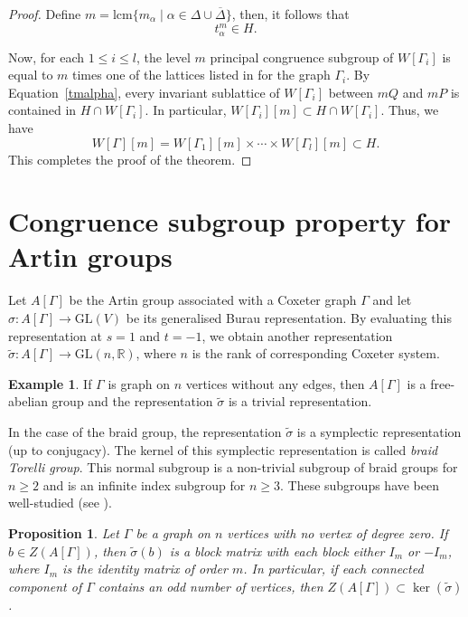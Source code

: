 \documentclass[12pt]{amsart}
\newtheorem{proposition}[equation]{Proposition}
\theoremstyle{definition}
\newtheorem{example}[equation]{Example}
\numberwithin{equation}{section}
\newcommand{\GL}{\mathrm{GL}}
\begin{document}
\begin{proof}
Define $m = \mathrm{lcm} \{ m_{\alpha} \; | \; \alpha \in \Delta\cup\overline{\Delta} \}$, then, it follows that 
 \begin{equation}\label{tmalpha}
 t^m_{\alpha} \in H.
 \end{equation}

 
Now, for each $1\leq i \leq l$, the level $m$ principal congruence subgroup of $W[\Gamma_i]$ is equal to $m$ times one of the lattices listed in \cite[Table 5]{MR1490241} for the graph $\Gamma_i$. By Equation~\eqref{tmalpha}, every invariant sublattice of $W[\Gamma_i]$ between $mQ$ and $mP$ is contained in $H\cap W[\Gamma_i]$. In particular, $W[\Gamma_i][m]\subset H\cap W[\Gamma_i]$. Thus,  we have
 $$
 W[\Gamma][m] = W[\Gamma_1][m] \times \cdots \times W[\Gamma_l][m]\subset H.
 $$
This completes the proof of the theorem.

\end{proof}

\section{Congruence subgroup property for Artin groups}\label{section 5}
Let $A[\Gamma]$ be the Artin group associated with a Coxeter graph $\Gamma$ and let $\sigma: A[\Gamma] \rightarrow \GL(V)$ be its generalised Burau representation. By evaluating this representation at $s=1$ and $t=-1$, we obtain another representation $\tilde{\sigma}:A[\Gamma]\to \GL(n,\mathbb R)$, where $n$ is the rank of corresponding Coxeter system. 

\begin{example}
If $\Gamma$ is graph on $n$ vertices without any edges, then $A[\Gamma]$ is a free-abelian group and the representation $\tilde{\sigma}$ is a trivial representation.
\end{example}

In the case of the braid group, the representation $\tilde{\sigma}$ is a symplectic representation (up to conjugacy). The kernel of this symplectic representation is called {\it braid Torelli group}. This normal subgroup is a non-trivial subgroup of braid groups for $n\geq 2$ and is an infinite index subgroup for $n\geq 3$. These subgroups have been well-studied (see \cite{MR3323579}). 


 \begin{proposition}\label{prop:centerkernel}
Let $\Gamma$ be a graph on $n$ vertices with no vertex of degree zero. If $b \in Z(A[\Gamma])$, then $\tilde{\sigma}(b)$ is a block matrix with each block either $I_m$ or $-I_m$, where $I_m$ is the identity matrix of order $m$.  In particular, if each connected component of $\Gamma$ contains an odd number of vertices, then $Z(A[\Gamma])\subset \ker(\tilde{\sigma})$. 
 \end{proposition}
    
\end{document}
